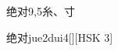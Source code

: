 \begin{entry}{绝对}{9,5}{⽷、⼨}
  \begin{phonetics}{绝对}{jue2dui4}[][HSK 3]
  \end{phonetics}
\end{entry}
